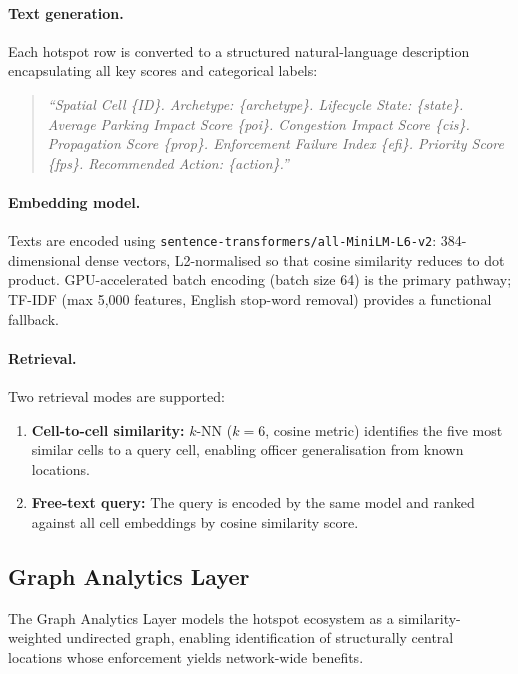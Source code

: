 \documentclass[12pt,a4paper]{article}
\begin{document}
\paragraph{Text generation.}
Each hotspot row is converted to a structured natural-language description encapsulating
all key scores and categorical labels:
\begin{quote}\small\itshape
``Spatial Cell \{ID\}. Archetype: \{archetype\}. Lifecycle State: \{state\}. Average
Parking Impact Score \{poi\}. Congestion Impact Score \{cis\}. Propagation Score
\{prop\}. Enforcement Failure Index \{efi\}. Priority Score \{fps\}. Recommended
Action: \{action\}.''
\end{quote}

\paragraph{Embedding model.}
Texts are encoded using \texttt{sentence-transformers/all-MiniLM-L6-v2}:
384-dimensional dense vectors, L2-normalised so that cosine similarity reduces to dot
product. GPU-accelerated batch encoding (batch size 64) is the primary pathway; TF-IDF
(max 5,000 features, English stop-word removal) provides a functional fallback.

\paragraph{Retrieval.}
Two retrieval modes are supported:
\begin{enumerate}
  \item \textbf{Cell-to-cell similarity:} $k$-NN ($k=6$, cosine metric) identifies
  the five most similar cells to a query cell, enabling officer generalisation from
  known locations.
  \item \textbf{Free-text query:} The query is encoded by the same model and ranked
  against all cell embeddings by cosine similarity score.
\end{enumerate}


\subsection{Graph Analytics Layer}

The Graph Analytics Layer models the hotspot ecosystem as a similarity-weighted undirected
graph, enabling identification of structurally central locations whose enforcement yields
network-wide benefits.
\end{document}
